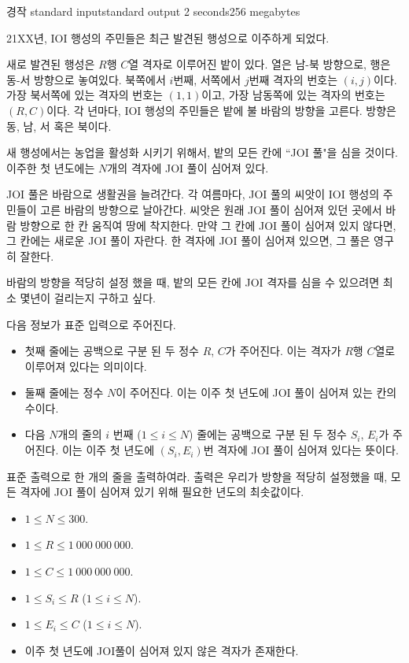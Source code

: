 \begin{problem}{경작}
	{standard input}{standard output}
	{2 seconds}{256 megabytes}{}
	
	21XX년, IOI 행성의 주민들은 최근 발견된 행성으로 이주하게 되었다.
	
	새로 발견된 행성은 $R$행 $C$열 격자로 이루어진 밭이 있다. 열은 남-북 방향으로, 행은 동-서 방향으로 놓여있다. 북쪽에서 $i$번째, 서쪽에서 $j$번째 격자의 번호는 $(i, j)$이다. 가장 북서쪽에 있는 격자의 번호는 $(1, 1)$이고, 가장 남동쪽에 있는 격자의 번호는 $(R, C)$이다. 각 년마다, IOI 행성의 주민들은 밭에 불 바람의 방향을 고른다. 방향은 동, 남, 서 혹은 북이다.
	
	새 행성에서는 농업을 활성화 시키기 위해서, 밭의 모든 칸에 ``JOI 풀"을 심을 것이다. 이주한 첫 년도에는 $N$개의 격자에 JOI 풀이 심어져 있다.
	
	JOI 풀은 바람으로 생활권을 늘려간다. 각 여름마다, JOI 풀의 씨앗이 IOI 행성의 주민들이 고른 바람의 방향으로 날아간다. 씨앗은 원래 JOI 풀이 심어져 있던 곳에서 바람 방향으로 한 칸 움직여 땅에 착지한다. 만약 그 칸에 JOI 풀이 심어져 있지 않다면, 그 칸에는 새로운 JOI 풀이 자란다. 한 격자에 JOI 풀이 심어져 있으면, 그 풀은 영구히 잘한다.
	
	바람의 방향을 적당히 설정 했을 때, 밭의 모든 칸에 JOI 격자를 심을 수 있으려면 최소 몇년이 걸리는지 구하고 싶다.
	

	\InputFile
	
	다음 정보가 표준 입력으로 주어진다.
	
	\begin{itemize}
		\item 첫째 줄에는 공백으로 구분 된 두 정수 $R$, $C$가 주어진다. 이는 격자가 $R$행 $C$열로 이루어져 있다는 의미이다.
		\item 둘째 줄에는 정수 $N$이 주어진다. 이는 이주 첫 년도에 JOI 풀이 심어져 있는 칸의 수이다.
		\item 다음 $N$개의 줄의 $i$ 번째 ($1 \le i \le N$) 줄에는 공백으로 구분 된 두 정수 $S_i$, $E_i$가 주어진다. 이는 이주 첫 년도에 $(S_i, E_i)$번 격자에 JOI 풀이 심어져 있다는 뜻이다.
	\end{itemize}

	
	\OutputFile
	
	표준 출력으로 한 개의 줄을 출력하여라. 출력은 우리가 방향을 적당히 설정했을 때, 모든 격자에 JOI 풀이 심어져 있기 위해 필요한 년도의 최솟값이다.
	
	\Constraints
	
	\begin{itemize}
	
	\item $1 \le N \le 300$.
	\item $1 \le R \le 1\ 000\ 000\ 000$.
	\item $1 \le C \le 1\ 000\ 000\ 000$.
	\item $1 \le S_i \le R$ ($1 \le i \le N$).
	\item $1 \le E_i \le C$ ($1 \le i \le N$).
	\item 이주 첫 년도에 JOI풀이 심어져 있지 않은 격자가 존재한다.		
	\end{itemize}
	

\end{problem}
